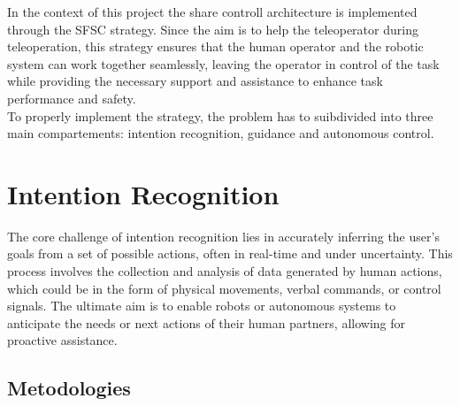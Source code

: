 In the context of this project the share controll architecture is implemented through the SFSC strategy. Since the aim is to help the teleoperator during teleoperation, this strategy ensures that the human operator and the robotic system can work together seamlessly, leaving the operator in control of the task while providing the necessary support and assistance to enhance task performance and safety.\\
To properly implement the strategy, the problem has to suibdivided into three main compartements: intention recognition, guidance and autonomous control.





\section{Intention Recognition}
The core challenge of intention recognition lies in accurately inferring the user's goals from a set of possible actions, often in real-time and under uncertainty. This process involves the collection and analysis of data generated by human actions, which could be in the form of physical movements, verbal commands, or control signals. The ultimate aim is to enable robots or autonomous systems to anticipate the needs or next actions of their human partners, allowing for proactive assistance.

\subsection{Metodologies}

